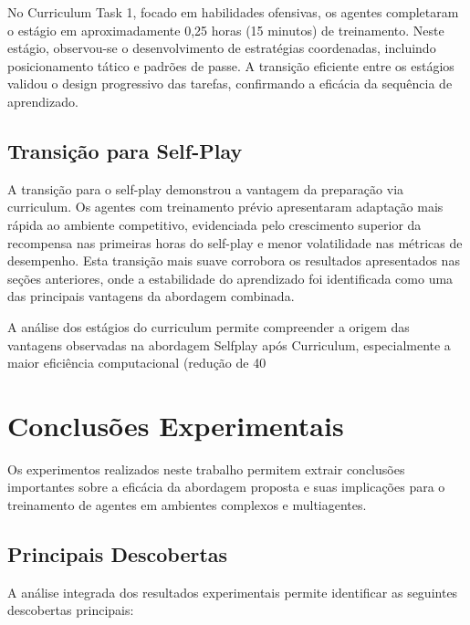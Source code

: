 No Curriculum Task 1, focado em habilidades ofensivas, os agentes completaram o estágio em aproximadamente 0,25 horas (15 minutos) de treinamento. Neste estágio, observou-se o desenvolvimento de estratégias coordenadas, incluindo posicionamento tático e padrões de passe. A transição eficiente entre os estágios validou o design progressivo das tarefas, confirmando a eficácia da sequência de aprendizado.

\subsection{Transição para Self-Play}

A transição para o self-play demonstrou a vantagem da preparação via curriculum. Os agentes com treinamento prévio apresentaram adaptação mais rápida ao ambiente competitivo, evidenciada pelo crescimento superior da recompensa nas primeiras horas do self-play e menor volatilidade nas métricas de desempenho. Esta transição mais suave corrobora os resultados apresentados nas seções anteriores, onde a estabilidade do aprendizado foi identificada como uma das principais vantagens da abordagem combinada.

A análise dos estágios do curriculum permite compreender a origem das vantagens observadas na abordagem Selfplay após Curriculum, especialmente a maior eficiência computacional (redução de 40%

\section{Conclusões Experimentais}
\label{sec:conclusoes_experimentais}

Os experimentos realizados neste trabalho permitem extrair conclusões importantes sobre a eficácia da abordagem proposta e suas implicações para o treinamento de agentes em ambientes complexos e multiagentes.

\subsection{Principais Descobertas}

A análise integrada dos resultados experimentais permite identificar as seguintes descobertas principais:

